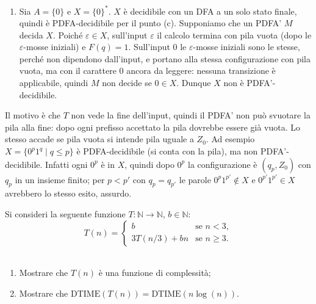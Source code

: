 \begin{sol}
\begin{enumerate}
\item Sia $A=\{0\}$ e $X=\{0\}^*$. $X$ è decidibile con un DFA a un solo stato finale, quindi è PDFA-decidibile per il punto (c). Supponiamo che un PDFA' $M$ decida $X$. Poiché $\varepsilon\in X$, sull'input $\varepsilon$ il calcolo termina con pila vuota (dopo le $\varepsilon$-mosse iniziali) e $F(q)=1$. Sull'input $0$ le $\varepsilon$-mosse iniziali sono le stesse, perché non dipendono dall'input, e portano alla stessa configurazione con pila vuota, ma con il carattere $0$ ancora da leggere: nessuna transizione è applicabile, quindi $M$ non decide se $0\in X$. Dunque $X$ non è PDFA'-decidibile.
\end{enumerate}
\begin{rema}
Il motivo è che $T$ non vede la fine dell'input, quindi il PDFA' non può svuotare la pila \glqq alla fine\grqq: dopo ogni prefisso accettato la pila dovrebbe essere già vuota. Lo stesso accade se \glqq pila vuota\grqq{} si intende \glqq pila uguale a $Z_0$\grqq. Ad esempio $X=\{0^p1^q\mid q\leq p\}$ è PDFA-decidibile (si conta con la pila), ma non PDFA'-decidibile. Infatti ogni $0^p$ è in $X$, quindi dopo $0^p$ la configurazione è $(q_p,Z_0)$ con $q_p$ in un insieme finito; per $p<p'$ con $q_p=q_{p'}$ le parole $0^p1^{p'}\notin X$ e $0^{p'}1^{p'}\in X$ avrebbero lo stesso esito, assurdo.
\end{rema}
\end{sol}
\newpage

\begin{ex}
Si consideri la seguente funzione $T:\mathbb N\to\mathbb N$, $b\in\mathbb N$:
\[
T(n)=
\begin{cases}
b & \text{se }n<3,\\
3T(n/3)+bn & \text{se }n\geq3.
\end{cases}
\]
\renewcommand{\labelenumi}{\alph{enumi})}
\ 
\begin{enumerate}
\item Mostrare che $T(n)$ è una funzione di complessità;
\item Mostrare che $\mathrm{DTIME}(T(n))=\mathrm{DTIME}(n\log(n))$.
\end{enumerate}
\end{ex}

